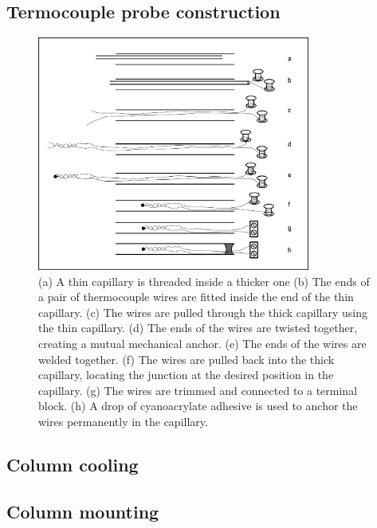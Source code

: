 \subsection{Termocouple probe construction}

\begin{figure}
	\centering
	\includegraphics[width=0.8\textwidth]{./Figures/FineWireThermocouple.pdf}
	\decoRule
	
\caption[A cartoon explaining how to construct a long, thin thermocouple
probe.]{(a) A thin capillary is threaded inside a thicker one (b) The ends of a
pair of thermocouple wires are fitted inside the end of the thin capillary. (c)
The wires are pulled through the thick capillary using the thin capillary. (d)
The ends of the wires are twisted together, creating a mutual mechanical anchor.
(e) The ends of the wires are welded together. (f) The wires are pulled back
into the thick capillary, locating the junction at the desired position in the
capillary. (g) The wires are trimmed and connected to a terminal block. (h) A
drop of cyanoacrylate adhesive is used to anchor the wires permanently in the
capillary. }
	
	\label{fig:FineWireThermocouple}
\end{figure}

\subsection{Column cooling}


\subsection{Column mounting}


